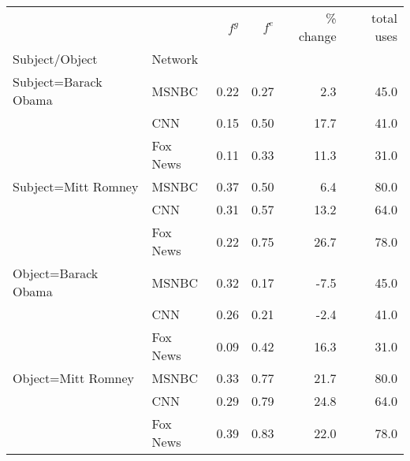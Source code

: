 \begin{tabular}{llrrrr}
\toprule
                    &     & $f^g$ & $f^e$ & \% change &  total uses \\
Subject/Object & Network &       &       &           &             \\
\midrule
Subject=Barack Obama & MSNBC &  0.22 &  0.27 &       2.3 &        45.0 \\
                    & CNN &  0.15 &  0.50 &      17.7 &        41.0 \\
                    & Fox News &  0.11 &  0.33 &      11.3 &        31.0 \\
Subject=Mitt Romney & MSNBC &  0.37 &  0.50 &       6.4 &        80.0 \\
                    & CNN &  0.31 &  0.57 &      13.2 &        64.0 \\
                    & Fox News &  0.22 &  0.75 &      26.7 &        78.0 \\
Object=Barack Obama & MSNBC &  0.32 &  0.17 &      -7.5 &        45.0 \\
                    & CNN &  0.26 &  0.21 &      -2.4 &        41.0 \\
                    & Fox News &  0.09 &  0.42 &      16.3 &        31.0 \\
Object=Mitt Romney & MSNBC &  0.33 &  0.77 &      21.7 &        80.0 \\
                    & CNN &  0.29 &  0.79 &      24.8 &        64.0 \\
                    & Fox News &  0.39 &  0.83 &      22.0 &        78.0 \\
\bottomrule
\end{tabular}
